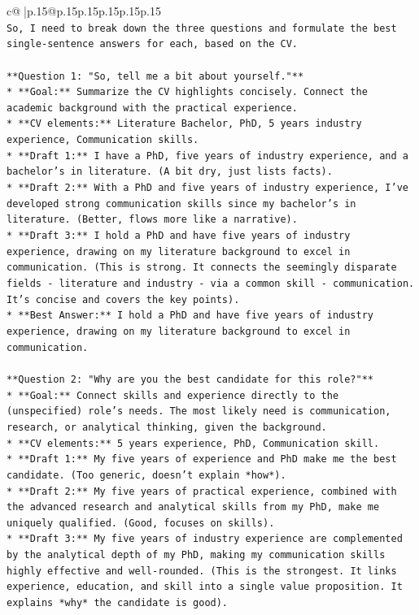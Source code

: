 \documentclass{article}
\begin{document}
{\begin{supertabular}{c@{$\;$}|p{.15\linewidth}@{}p{.15\linewidth}p{.15\linewidth}p{.15\linewidth}p{.15\linewidth}p{.15\linewidth}}
{{{\\ 
\texttt{So, I need to break down the three questions and formulate the best single{-}sentence answers for each, based on the CV.} \\
\\ 
\texttt{**Question 1: "So, tell me a bit about yourself."**} \\
\texttt{*   **Goal:** Summarize the CV highlights concisely. Connect the academic background with the practical experience.} \\
\texttt{*   **CV elements:** Literature Bachelor, PhD, 5 years industry experience, Communication skills.} \\
\texttt{*   **Draft 1:** I have a PhD, five years of industry experience, and a bachelor's in literature. (A bit dry, just lists facts).} \\
\texttt{*   **Draft 2:** With a PhD and five years of industry experience, I've developed strong communication skills since my bachelor's in literature. (Better, flows more like a narrative).} \\
\texttt{*   **Draft 3:** I hold a PhD and have five years of industry experience, drawing on my literature background to excel in communication. (This is strong. It connects the seemingly disparate fields {-} literature and industry {-} via a common skill {-} communication. It's concise and covers the key points).} \\
\texttt{*   **Best Answer:** I hold a PhD and have five years of industry experience, drawing on my literature background to excel in communication.} \\
\\ 
\texttt{**Question 2: "Why are you the best candidate for this role?"**} \\
\texttt{*   **Goal:** Connect skills and experience directly to the (unspecified) role's needs. The most likely need is communication, research, or analytical thinking, given the background.} \\
\texttt{*   **CV elements:** 5 years experience, PhD, Communication skill.} \\
\texttt{*   **Draft 1:** My five years of experience and PhD make me the best candidate. (Too generic, doesn't explain *how*).} \\
\texttt{*   **Draft 2:** My five years of practical experience, combined with the advanced research and analytical skills from my PhD, make me uniquely qualified. (Good, focuses on skills).} \\
\texttt{*   **Draft 3:** My five years of industry experience are complemented by the analytical depth of my PhD, making my communication skills highly effective and well{-}rounded. (This is the strongest. It links experience, education, and skill into a single value proposition. It explains *why* the candidate is good).} \\
}}}
\end{supertabular}}
\end{document}
